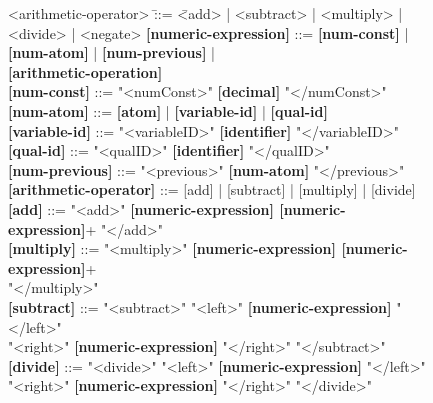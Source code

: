 \begin{figure}[p]
\begin{tcolorbox}[title=iStar-DT-X Grammar,colbacktitle=orange!40!white,coltitle=black,fonttitle=\bfseries,adjusted title=iStarDT-X Grammar (1/3),halign title=flush center]
\begin{scriptsize}
\begin{tabbing}
<arithmetic-operator> \= ::= \= <add> | <subtract> | <multiply> | <divide> | <negate> \kill
\textbf{[numeric-expression]} \> ::= \> \textbf{[num-const]} | \textbf{[num-atom]} | \textbf{[num-previous]} | \\\>\> \textbf{[arithmetic-operation]}\\
\textbf{[num-const]} \> ::= "<numConst>" \textbf{[decimal]} "</numConst>" \\
\textbf{[num-atom]} \> ::= \textbf{[atom]}  | \textbf{[variable-id]} | \textbf{[qual-id]} \\
\textbf{[variable-id]} \> ::= "<variableID>" \textbf{[identifier]} "</variableID>" \\
\textbf{[qual-id]} \> ::= "<qualID>" \textbf{[identifier]} "</qualID>" \\
\textbf{[num-previous]} \> ::= "<previous>" \textbf{[num-atom]} "</previous>"\\
\textbf{[arithmetic-operator]} \> ::= [add] | [subtract] | [multiply] | [divide] \\ %
\textbf{[add]} \> ::= "<add>" \textbf{[numeric-expression] [numeric-expression]}+ "</add>" \\
\textbf{[multiply]} \> ::= "<multiply>" \textbf{[numeric-expression] [numeric-expression]}+\\\>\> "</multiply>"\\
\textbf{[subtract]} \> ::= \> "<subtract>" "<left>" \textbf{[numeric-expression]} "</left>" \\
\>\> "<right>" \textbf{[numeric-expression]} "</right>" "</subtract>"\\
\textbf{[divide]} \> ::= "<divide>" "<left>" \textbf{[numeric-expression]} "</left>" \\ 
\>\> "<right>" \textbf{[numeric-expression]} "</right>" "</divide>"
\end{tabbing}
\end{scriptsize}


\end{tcolorbox}
\end{figure}

